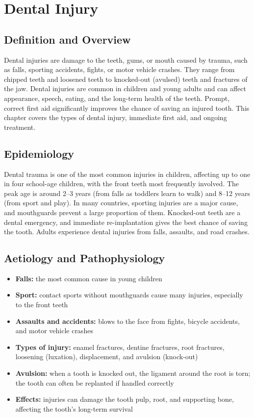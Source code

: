 \chapter{Dental Injury}

\section*{Definition and Overview}
Dental injuries are damage to the teeth, gums, or mouth caused by trauma, such as falls, sporting accidents, fights, or motor vehicle crashes. They range from chipped teeth and loosened teeth to knocked-out (avulsed) teeth and fractures of the jaw. Dental injuries are common in children and young adults and can affect appearance, speech, eating, and the long-term health of the teeth. Prompt, correct first aid significantly improves the chance of saving an injured tooth. This chapter covers the types of dental injury, immediate first aid, and ongoing treatment.

\section*{Epidemiology}
Dental trauma is one of the most common injuries in children, affecting up to one in four school-age children, with the front teeth most frequently involved. The peak age is around 2--3 years (from falls as toddlers learn to walk) and 8--12 years (from sport and play). In many countries, sporting injuries are a major cause, and mouthguards prevent a large proportion of them. Knocked-out teeth are a dental emergency, and immediate re-implantation gives the best chance of saving the tooth. Adults experience dental injuries from falls, assaults, and road crashes.

\section*{Aetiology and Pathophysiology}
\begin{itemize}
    \item \textbf{Falls:} the most common cause in young children
    \item \textbf{Sport:} contact sports without mouthguards cause many injuries, especially to the front teeth
    \item \textbf{Assaults and accidents:} blows to the face from fights, bicycle accidents, and motor vehicle crashes
    \item \textbf{Types of injury:} enamel fractures, dentine fractures, root fractures, loosening (luxation), displacement, and avulsion (knock-out)
    \item \textbf{Avulsion:} when a tooth is knocked out, the ligament around the root is torn; the tooth can often be replanted if handled correctly
    \item \textbf{Effects:} injuries can damage the tooth pulp, root, and supporting bone, affecting the tooth's long-term survival
\end{itemize}

